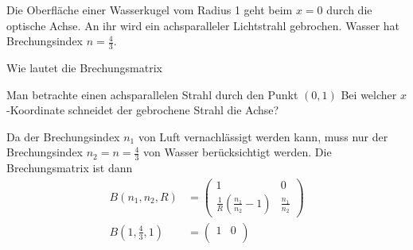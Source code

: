 Die Oberfläche einer Wasserkugel vom Radius 1 geht beim $x=0$ durch die 
optische Achse.
An ihr wird ein achsparalleler Lichtstrahl gebrochen.
Wasser hat Brechungsindex $n=\frac{4}{3}$.
\begin{teilaufgaben}
\item
Wie lautet die Brechungsmatrix
\item
Man betrachte einen achsparallelen Strahl durch den Punkt $(0,1)$
Bei welcher $x$-Koordinate schneidet der gebrochene Strahl die Achse?
\end{teilaufgaben}


\begin{loesung}
\begin{center}
\end{center}
\begin{teilaufgaben}
\item
Da der Brechungsindex $n_1$ von Luft vernachlässigt werden kann, muss nur der
Brechungsindex $n_2=n=\frac43$ von Wasser berücksichtigt werden.
Die Brechungsmatrix  ist dann
\begin{align*}
B(n_1,n_2,R)
&=
\begin{pmatrix}
1&0\\
\frac{1}{R}\left(\frac{n_1}{n_2}-1\right) & \frac{n_1}{n_2}
\end{pmatrix}
\\
B(1,{\textstyle\frac43},1)
&=
\begin{pmatrix}
1&0\\

\end{pmatrix}
\end{align*}
\end{teilaufgaben}
\end{loesung}
